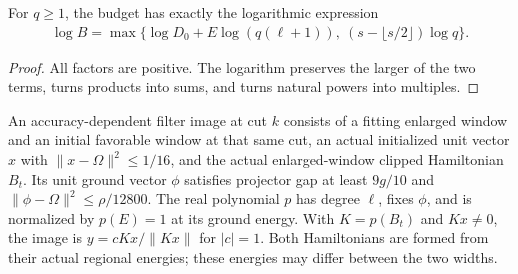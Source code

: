 \begin{lemma}
    \label{thm:aklv_accuracy_rank_log}
    \leanok
    For $q\ge1$, the budget has exactly the logarithmic expression
    \begin{align*}
        \log B=\max\{\log D_0+E\log(q(\ell+1)),\
        (s-\lfloor s/2\rfloor)\log q\}.
    \end{align*}
\end{lemma}
\begin{proof}
    \leanok
    All factors are positive. The logarithm preserves the larger of the two
    terms, turns products into sums, and turns natural powers into multiples.
\end{proof}

\begin{definition}
    \label{def:aklv_accuracy_filter_image}
    \leanok
    An accuracy-dependent filter image at cut $k$ consists of a fitting
    enlarged window and an initial favorable window at that same cut,
    an actual initialized unit vector $x$ with $\|x-\Omega\|^2\le1/16$,
    and the actual enlarged-window clipped Hamiltonian $B_t$.
    Its unit ground vector $\phi$ satisfies projector gap at least $9g/10$
    and $\|\phi-\Omega\|^2\le\rho/12800$.
    The real polynomial $p$ has degree $\ell$, fixes $\phi$, and is normalized
    by $p(E)=1$ at its ground energy. With $K=p(B_t)$ and $Kx\ne0$, the
    image is $y=cKx/\|Kx\|$ for $|c|=1$.
    Both Hamiltonians are formed from their actual regional energies;
    these energies may differ between the two widths.
\end{definition}

